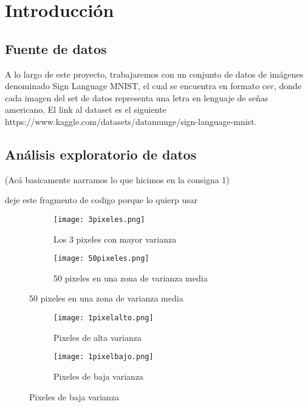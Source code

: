 \documentclass[10pt,a4paper]{article}
\begin{document}
\maketitle

\section{Introducción}

\subsection{Fuente de datos}

A lo largo de este proyecto, trabajaremos con un conjunto de datos de imágenes denominado Sign
Language MNIST, el cual se encuentra en formato csv, donde cada imagen del set de datos representa una letra en lenguaje de
señas americano. El link al dataset es el siguiente https://www.kaggle.com/datasets/datamunge/sign-language-mnist.

\subsection{Análisis exploratorio de datos}

(Acá basicamente narramos lo que hicimos en la consigna 1)

deje este fragmento de codigo porque lo quierp usar

\begin{figure}[ht!]
	\begin{subfigure}{0.5\textwidth}
		\texttt{[image: 3pixeles.png]} 
		\caption{Los 3 pixeles con mayor varianza}
		\label{fig:subfig1}
	\end{subfigure}
	\begin{subfigure}{0.5\textwidth}
		\texttt{[image: 50pixeles.png]}
		\caption{50 pixeles en una zona de varianza media}
		\label{fig:subfig2}
	\end{subfigure}
	\label{fig:subfigs}
\end{figure}



\begin{figure}[ht!]
	\begin{subfigure}{0.5\textwidth}
		\texttt{[image: 1pixelalto.png]} 
		\caption{Pixeles de alta varianza}
		\label{fig:subfig1}
	\end{subfigure}
	\begin{subfigure}{0.5\textwidth}
		\texttt{[image: 1pixelbajo.png]}
		\caption{Pixeles de baja varianza}
		\label{fig:subfig2}
	\end{subfigure}
	\label{fig:subfigs}
\end{figure}
\end{document}
